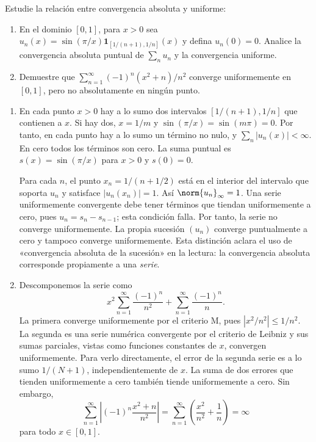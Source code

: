\begin{ejercicio}\label{ej:lectura-26-5}
Estudie la relación entre convergencia absoluta y uniforme:
\begin{enumerate}[label=(\roman*)]
\item En el dominio $[0,1]$, para $x>0$ sea $u_n(x)=\sin(\pi/x)\mathbf1_{[1/(n+1),1/n]}(x)$ y defina $u_n(0)=0$. Analice la convergencia absoluta puntual de $\sum_nu_n$ y la convergencia uniforme.
\item Demuestre que $\sum_{n=1}^\infty(-1)^n(x^2+n)/n^2$ converge uniformemente en $[0,1]$, pero no absolutamente en ningún punto.
\end{enumerate}
\end{ejercicio}
\begin{solucion}
\begin{enumerate}[label=(\roman*)]
\item En cada punto $x>0$ hay a lo sumo dos intervalos $[1/(n+1),1/n]$ que contienen a $x$. Si hay dos, $x=1/m$ y $\sin(\pi/x)=\sin(m\pi)=0$. Por tanto, en cada punto hay a lo sumo un término no nulo, y $\sum_n|u_n(x)|<\infty$. En cero todos los términos son cero. La suma puntual es $s(x)=\sin(\pi/x)$ para $x>0$ y $s(0)=0$.

Para cada $n$, el punto $x_n=1/(n+1/2)$ está en el interior del intervalo que soporta $u_n$ y satisface $|u_n(x_n)|=1$. Así $\norm{u_n}_\infty=1$. Una serie uniformemente convergente debe tener términos que tiendan uniformemente a cero, pues $u_n=s_n-s_{n-1}$; esta condición falla. Por tanto, la serie no converge uniformemente. La propia sucesión $(u_n)$ converge puntualmente a cero y tampoco converge uniformemente. Esta distinción aclara el uso de «convergencia absoluta de la sucesión» en la lectura: la convergencia absoluta corresponde propiamente a una \emph{serie}.
\item Descomponemos la serie como
\[
 x^2\sum_{n=1}^\infty\frac{(-1)^n}{n^2}
 +\sum_{n=1}^\infty\frac{(-1)^n}{n}.
\]
La primera converge uniformemente por el criterio M, pues $|x^2/n^2|\le1/n^2$. La segunda es una serie numérica convergente por el criterio de Leibniz y sus sumas parciales, vistas como funciones constantes de $x$, convergen uniformemente. Para verlo directamente, el error de la segunda serie es a lo sumo $1/(N+1)$, independientemente de $x$. La suma de dos errores que tienden uniformemente a cero también tiende uniformemente a cero. Sin embargo,
\[
 \sum_{n=1}^\infty\left|(-1)^n\frac{x^2+n}{n^2}\right|
 =\sum_{n=1}^\infty\left(\frac{x^2}{n^2}+\frac1n\right)=\infty
\]
para todo $x\in[0,1]$.
\end{enumerate}
\end{solucion}

